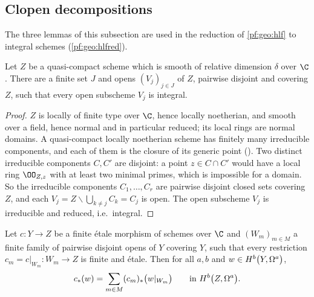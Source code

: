 \subsection{Clopen decompositions}\label{sec:pf:hlf-cech:clopen}

The three lemmas of this subsection are used in the reduction of \cref{pf:geo:hlf} to integral schemes (\cref{pf:geo:hlfred}).

\begin{lemma}\label{pf:hlf-cech:clopendec}
Let $Z$ be a quasi-compact scheme which is smooth of relative dimension $\delta$ over $\C$. There are a finite set $J$ and opens
$(V_j)_{j\in J}$ of $Z$, pairwise disjoint and covering $Z$, such that every open subscheme $V_j$ is integral.
\end{lemma}

\begin{proof}
$Z$ is locally of finite type over $\C$, hence locally noetherian, and smooth over a field, hence normal and in particular reduced; its local
rings are normal domains. A quasi-compact locally noetherian scheme has finitely many irreducible components, and each of them is the
closure of its generic point (). Two distinct irreducible components
$C,C'$ are disjoint: a point $z\in C\cap C'$ would have a local ring $\OO_{Z,z}$ with at least two minimal primes, which is impossible for a
domain. So the irreducible components $C_1,\dots,C_r$ are pairwise disjoint closed sets covering $Z$, and each $V_j=Z\smallsetminus\bigcup_{k\ne
j}C_k=C_j$ is open. The open subscheme $V_j$ is irreducible and reduced, i.e.\ integral.
\end{proof}

\begin{lemma}\label{pf:hlf-cech:tracesum}
Let $c\colon Y\to Z$ be a finite \'etale morphism of schemes over $\C$ and $(W_m)_{m\in M}$ a finite family of pairwise disjoint opens of $Y$
covering $Y$, such that every restriction $c_m=c|_{W_m}\colon W_m\to Z$ is finite and \'etale. Then for all $a,b$ and $w\in\hlfcechHdg{Y}{a}{b}$,
\[
  c_*(w)=\sum_{m\in M}(c_m)_*\bigl(w|_{W_m}\bigr)\qquad\text{in }\hlfcechHdg{Z}{a}{b}.
\]
\end{lemma}

